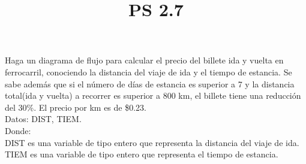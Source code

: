 \documentclass[11pt]{amsart}
\title{PS 2.7}
\begin{document}
\maketitle

\noindent Haga un diagrama de flujo para calcular el precio del billete ida y vuelta en ferrocarril, conociendo la distancia del viaje de ida y el tiempo de estancia. Se sabe además que si el número de días de estancia es superior a 7 y la distancia total(ida y vuelta) a recorrer es superior a 800 km, el billete tiene una reducción del 30\%. El precio por km es de \$0.23.\\

\noindent \quad Datos: DIST, TIEM.\\

\noindent  Donde:\\

\noindent \quad \quad DIST es una variable de tipo entero que representa la distancia del viaje de ida.\\

\noindent \quad \quad TIEM es una variable de tipo entero que representa el tiempo de estancia.\\
\end{document}
